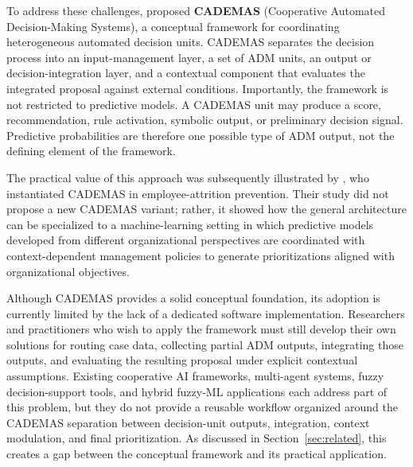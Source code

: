 \documentclass[journal,article,submit,pdftex,moreauthors,mathematics]{Definitions/mdpi}
\begin{document}
To address these challenges, \citet{NovoaHernandez2026} proposed \textbf{CADEMAS} (Cooperative Automated Decision-Making Systems), a conceptual framework for coordinating heterogeneous automated decision units. CADEMAS separates the decision process into an input-management layer, a set of ADM units, an output or decision-integration layer, and a contextual component that evaluates the integrated proposal against external conditions. Importantly, the framework is not restricted to predictive models. A CADEMAS unit may produce a score, recommendation, rule activation, symbolic output, or preliminary decision signal. Predictive probabilities are therefore one possible type of ADM output, not the defining element of the framework.

The practical value of this approach was subsequently illustrated by \citet{Godz2026}, who instantiated CADEMAS in employee-attrition prevention. Their study did not propose a new CADEMAS variant; rather, it showed how the general architecture can be specialized to a machine-learning setting in which predictive models developed from different organizational perspectives are coordinated with context-dependent management policies to generate prioritizations aligned with organizational objectives.

Although CADEMAS provides a solid conceptual foundation, its adoption is currently limited by the lack of a dedicated software implementation. Researchers and practitioners who wish to apply the framework must still develop their own solutions for routing case data, collecting partial ADM outputs, integrating those outputs, and evaluating the resulting proposal under explicit contextual assumptions. Existing cooperative AI frameworks, multi-agent systems, fuzzy decision-support tools, and hybrid fuzzy-ML applications each address part of this problem, but they do not provide a reusable workflow organized around the CADEMAS separation between decision-unit outputs, integration, context modulation, and final prioritization. As discussed in Section~\ref{sec:related}, this creates a gap between the conceptual framework and its practical application.
\end{document}
